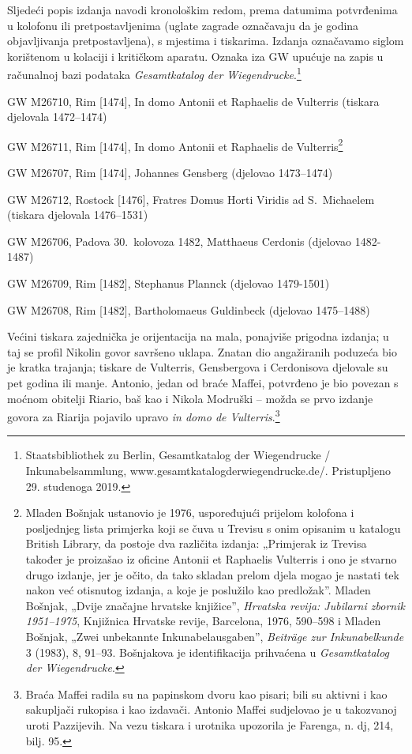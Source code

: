 \documentclass[a5paper,twoside]{article}
\begin{document}
Sljedeći popis izdanja navodi kronološkim redom, prema datumima potvrđenima u kolofonu ili pretpostavljenima (uglate zagrade označavaju da je godina objavljivanja pretpostavljena), s mjestima i tiskarima. Izdanja označavamo siglom korištenom u kolaciji i kritičkom aparatu. Oznaka iza GW upućuje na zapis u računalnoj bazi podataka \textit{Gesamtkatalog der Wiegendrucke}.\footnote{Staatsbibliothek zu Berlin, Gesamtkatalog der Wiegendrucke / Inkunabelsammlung, www.gesamtkatalogderwiegendrucke.de/. Pristupljeno 29. studenoga 2019.}

\begin{description}[nolistsep,itemsep=3pt,font=\rmfamily]
\item[V\hphantom{e}] GW M26710, Rim [1474], In domo Antonii et Raphaelis de Vulterris (tiskara djelovala 1472–1474)
\item[V1] GW M26711, Rim [1474], In domo Antonii et Raphaelis de Vulterris\footnote{Mladen Bošnjak ustanovio je 1976, uspoređujući prijelom kolofona i posljednjeg lista primjerka koji se čuva u Trevisu s onim opisanim u katalogu British Library, da postoje dva različita izdanja: „Primjerak iz Trevisa također je proizašao iz oficine Antonii et Raphaelis Vulterris i ono je stvarno drugo izdanje, jer je očito, da tako skladan prelom djela mogao je nastati tek nakon već otisnutog izdanja, a koje je poslužilo kao predložak”. Mladen Bošnjak, „Dvije značajne hrvatske knjižice”, \textit{Hrvatska revija: Jubilarni zbornik 1951–1975}, Knjižnica Hrvatske revije, Barcelona, 1976, 590–598 i Mladen Bošnjak, „Zwei unbekannte Inkunabelausgaben”, \textit{Beiträge zur Inkunabelkunde} 3 (1983), 8, 91–93. Bošnjakova je identifikacija prihvaćena u \textit{Gesamtkatalog der Wiegendrucke}.}
\item[Ge] GW M26707, Rim [1474], Johannes Gensberg (djelovao 1473–1474)
\item[R\hphantom{o}] GW M26712, Rostock [1476], Fratres Domus Horti Viridis ad S.~Michaelem (tiskara djelovala 1476–1531)
\item[C\hphantom{d}] GW M26706, Padova 30.~kolovoza 1482, Matthaeus Cerdonis (djelovao 1482-1487)
\item[P\hphantom{d}] GW M26709, Rim [1482], Stephanus Plannck (djelovao 1479-1501)
\item[Gd] GW M26708, Rim [1482], Bartholomaeus Guldinbeck (djelovao 1475–1488)
\end{description}

Većini tiskara zajednička je orijentacija na mala, ponajviše prigodna izdanja; u taj se profil Nikolin govor savršeno uklapa. Znatan dio angažiranih poduzeća bio je kratka trajanja; tiskare de Vulterris, Gensbergova i Cerdonisova djelovale su pet godina ili manje. Antonio, jedan od braće Maffei, potvrđeno je bio povezan s moćnom obitelji Riario, baš kao i Nikola Modruški – možda se prvo izdanje govora za Riarija pojavilo upravo \textit{in domo de Vulterris}.\footnote{Braća Maffei radila su na papinskom dvoru kao pisari; bili su aktivni i kao sakupljači rukopisa i kao izdavači. Antonio Maffei sudjelovao je u takozvanoj uroti Pazzijevih. Na vezu tiskara i urotnika upozorila je Farenga, n. dj, 214, bilj. 95.}
\end{document}
